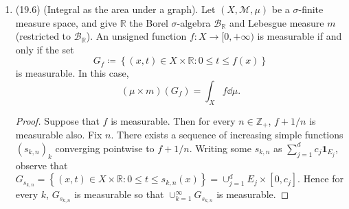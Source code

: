 \documentclass[11pt]{article}
\newcommand{\cbr}[1]{\left\{#1\right\}}
\begin{document}
\begin{enumerate}
\begin{proof}
      Let $(f_n)$ be a dominated sequence (by $g\in L^1$) converging to $f$ almost everywhere. Without loss of generality modify each of the $f_n$ on null sets so that $(f_n)$ converges to $f$ everywhere. For $N,k\geq 1$, let $E_{N,k} = \cup_{n=N}^\infty\cbr{x\colon\abs{f_n(x)-f(x)}\geq 1/k}$. Observe that $E_{1,k}$ for fixed $k$ has finite measure: for any $n$, if $\abs{f_n(x)-f(x)}\geq 1/k$ then by the triangle inequality $2\abs{g(x)} = \abs{2g(x)} \geq 1/k$. Thus $E_{1,k}\subseteq \cbr{x\colon \abs{2g(x)} \geq 1/k}$, and the latter has finite measure since $2g\in L^1$ (otherwise we arrive at a contradiction). 

      Let $k$ be fixed. Then for each $x$ there is an $N$ such that $\abs{f_n(x)-f(x)}<1/k$ for all $n\geq N$. It follows that $\cap_{N=1}^\infty E_{N,k} = \emptyset$. The $E_{N,k}$ are decreasing in $N$ and are contained in $E_{1,k}$ which has finite measure; by dominated convergence for sets, we have for fixed $k$ the sequence $(\mu(E_{N,k}))_N$ tends to zero. 

      Let $\varepsilon>0$ be given. For each $k$ choose $N_k$ such that $\mu(E_{N_k,k})<\varepsilon 2^{-k}$. Let $E = \cup_{k=1}^\infty E_{N_k,k}$, so that $\mu(E)<\varepsilon$. We show that $(f_n)$ converges uniformly to $f$ on $E^c$. Let $\eta>0$ be given and choose $k$ such that $1/k<\eta$. Let $x\in E^c$ and take $n\geq N_k$; since $E^c\subseteq E_{N_k,k}^c$ we have $\abs{f_n(x)=f(x)}<1/k<\eta$. Since $x$ was arbitrary in $E^c$ we have that $(f_n)$ converges to $f$ uniformly on $E^c$, so $(f_n)$ converges to $f$ almost uniformly.
    \end{proof}
    \item (19.6) (Integral as the area under a graph). Let $(X,\mathscr{M},\mu)$ be a $\sigma$-finite measure space, and give $\mathbb{R}$ the Borel $\sigma$-algebra $\mathscr{B}_\mathbb{R}$ and Lebesgue measure $m$ (restricted to $\mathscr{B}_\mathbb{R}$). An unsigned function $f\colon X\to[0,+\infty)$ is measurable if and only if the set \[G_f\coloneqq \cbr{(x,t)\in X\times \mathbb{R}\colon 0\leq t\leq f(x)}\] is measurable. In this case, \[(\mu\times m)(G_f) = \int_X f\dd{\mu}.\] \begin{proof}
      Suppose that $f$ is measurable. Then for every $n\in\mathbb{Z}_+$, $f+1/n$ is measurable also. Fix $n$. There exists a sequence of increasing simple functions $(s_{k,n})_k$ converging pointwise to $f+1/n$. Writing some $s_{k,n}$ as $\sum_{j=1}^d c_j\mathbf{1}_{E_j}$, observe that $G_{s_{k,n}} = \cbr{(x,t)\in X\times \mathbb{R}\colon 0\leq t\leq s_{k,n}(x)} = \cup_{j=1}^d E_j\times [0,c_j]$. Hence for every $k$, $G_{s_{k,n}}$ is measurable so that $\cup_{k=1}^\infty G_{s_{k,n}}$ is measurable.


\end{proof}
\end{enumerate}
\end{document}
